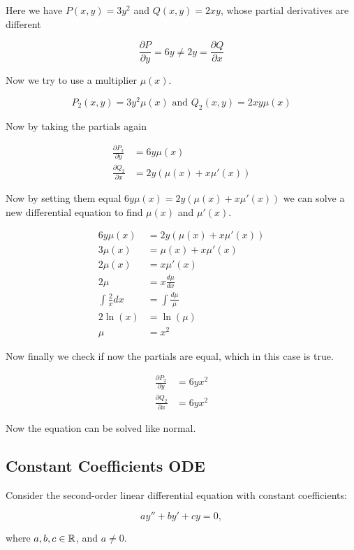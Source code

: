 Here we have \(P(x,y) = 3y^2\) and \(Q(x,y) = 2xy\), whose partial derivatives are different

\[
    \frac{\partial P}{\partial y} = 6y \ne 2y = \frac{\partial Q}{\partial x}
\]

Now we try to use a multiplier \(\mu(x)\).

\[
    P_2 (x,y) = 3y^2 \mu(x) \text{ and } Q_2 (x,y)  = 2xy\mu(x)
\]

Now by taking the partials again

\begin{align*}
    \frac{\partial P_2}{\partial y} &= 6y\mu(x)\\  
    \frac{\partial Q_2}{\partial x} &= 2y(\mu(x) + x\mu'(x))  
\end{align*}

Now by setting them equal \(6y\mu(x) = 2y(\mu(x) + x\mu'(x))\) we can solve a new differential equation 
to find \(\mu(x)\) and \(\mu'(x)\).  

\begin{align*}
    6y\mu(x) &= 2y(\mu(x) + x\mu'(x)) \\
    3\mu(x) &= \mu(x) + x\mu'(x) \\
    2\mu(x) &= x\mu'(x)\\
    2\mu &= x \frac{d\mu}{dx} \\
    \int \frac{2}{x}dx &= \int \frac{d\mu}{\mu} \\
    2\ln(x) &= \ln(\mu) \\
    \mu &= x^2
\end{align*}

Now finally we check if now the partials are equal, which in this case is true.

\begin{align*}
    \frac{\partial P_2}{\partial y} &= 6yx^2\\  
    \frac{\partial Q_2}{\partial x} &= 6yx^2  
\end{align*}

Now the equation can be solved like normal.

\subsection{Constant Coefficients ODE}

Consider the second-order linear differential equation with constant coefficients:

\[
    a y'' + b y' + c y = 0,
\]

where \( a, b, c \in \mathbb{R} \), and \( a \neq 0 \).

